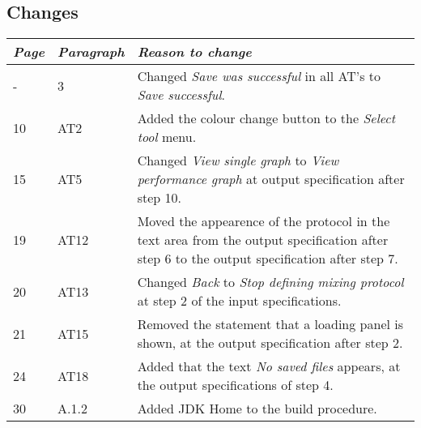 \subsection*{Changes}
\begin{tabularx}{\textwidth}{llX}
    \toprule
    \emph{Page} & \emph{Paragraph} & \emph{Reason to change} \\
    \midrule
    - & 3 & Changed \emph{Save was successful} in all AT's to \emph{Save successful}. \\
    10 & AT2 & Added the colour change button to the \emph{Select tool} menu. \\
    15 & AT5 & Changed \emph{View single graph} to \emph{View performance graph} at output specification after step 10. \\
    19 & AT12 & Moved the appearence of the protocol in the text area from the output specification after step 6 to the output specification after step 7. \\
    20 & AT13 & Changed \emph{Back} to \emph{Stop defining mixing protocol} at step 2 of the input specifications. \\
    21 & AT15 & Removed the statement that a loading panel is shown, at the output specification after step 2. \\
    24 & AT18 & Added that the text \emph{No saved files} appears, at the output specifications of step 4.\\
    30 & A.1.2 & Added JDK Home to the build procedure.\\
    \bottomrule
\end{tabularx}
